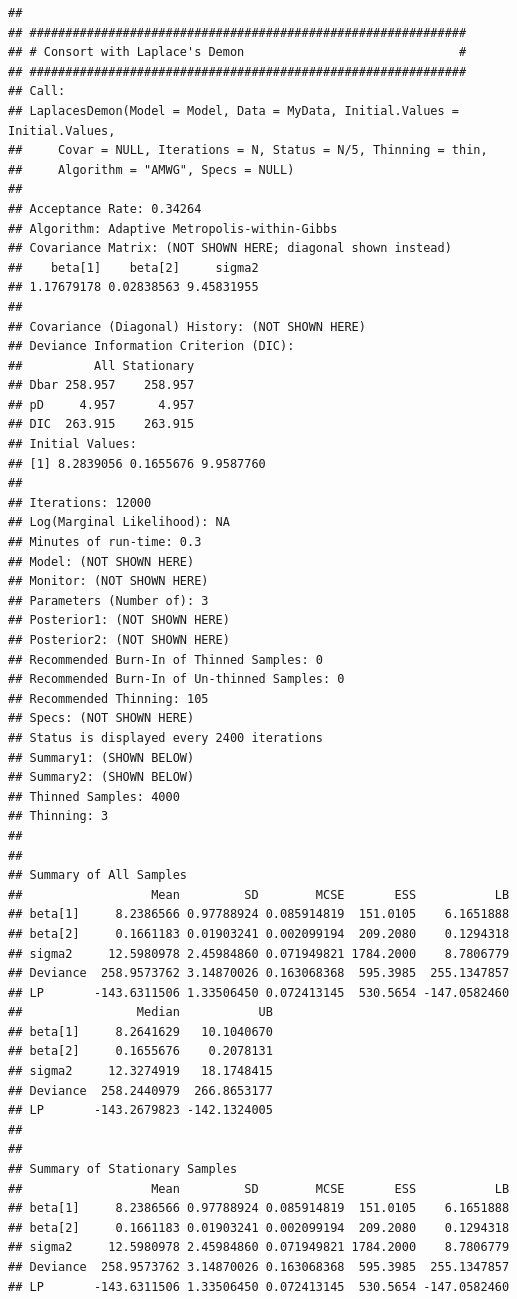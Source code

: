 \documentclass[
]{book}
\begin{document}
\begin{verbatim}
## 
## #############################################################
## # Consort with Laplace's Demon                              #
## #############################################################
## Call:
## LaplacesDemon(Model = Model, Data = MyData, Initial.Values = Initial.Values, 
##     Covar = NULL, Iterations = N, Status = N/5, Thinning = thin, 
##     Algorithm = "AMWG", Specs = NULL)
## 
## Acceptance Rate: 0.34264
## Algorithm: Adaptive Metropolis-within-Gibbs
## Covariance Matrix: (NOT SHOWN HERE; diagonal shown instead)
##    beta[1]    beta[2]     sigma2 
## 1.17679178 0.02838563 9.45831955 
## 
## Covariance (Diagonal) History: (NOT SHOWN HERE)
## Deviance Information Criterion (DIC):
##          All Stationary
## Dbar 258.957    258.957
## pD     4.957      4.957
## DIC  263.915    263.915
## Initial Values:
## [1] 8.2839056 0.1655676 9.9587760
## 
## Iterations: 12000
## Log(Marginal Likelihood): NA
## Minutes of run-time: 0.3
## Model: (NOT SHOWN HERE)
## Monitor: (NOT SHOWN HERE)
## Parameters (Number of): 3
## Posterior1: (NOT SHOWN HERE)
## Posterior2: (NOT SHOWN HERE)
## Recommended Burn-In of Thinned Samples: 0
## Recommended Burn-In of Un-thinned Samples: 0
## Recommended Thinning: 105
## Specs: (NOT SHOWN HERE)
## Status is displayed every 2400 iterations
## Summary1: (SHOWN BELOW)
## Summary2: (SHOWN BELOW)
## Thinned Samples: 4000
## Thinning: 3
## 
## 
## Summary of All Samples
##                  Mean         SD        MCSE       ESS           LB
## beta[1]     8.2386566 0.97788924 0.085914819  151.0105    6.1651888
## beta[2]     0.1661183 0.01903241 0.002099194  209.2080    0.1294318
## sigma2     12.5980978 2.45984860 0.071949821 1784.2000    8.7806779
## Deviance  258.9573762 3.14870026 0.163068368  595.3985  255.1347857
## LP       -143.6311506 1.33506450 0.072413145  530.5654 -147.0582460
##                Median           UB
## beta[1]     8.2641629   10.1040670
## beta[2]     0.1655676    0.2078131
## sigma2     12.3274919   18.1748415
## Deviance  258.2440979  266.8653177
## LP       -143.2679823 -142.1324005
## 
## 
## Summary of Stationary Samples
##                  Mean         SD        MCSE       ESS           LB
## beta[1]     8.2386566 0.97788924 0.085914819  151.0105    6.1651888
## beta[2]     0.1661183 0.01903241 0.002099194  209.2080    0.1294318
## sigma2     12.5980978 2.45984860 0.071949821 1784.2000    8.7806779
## Deviance  258.9573762 3.14870026 0.163068368  595.3985  255.1347857
## LP       -143.6311506 1.33506450 0.072413145  530.5654 -147.0582460

\end{verbatim}
\end{document}
